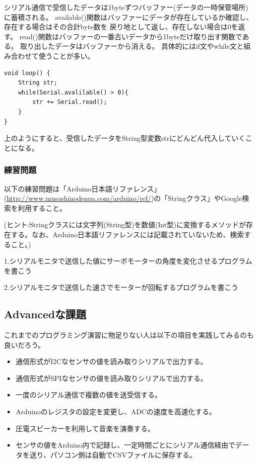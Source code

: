 \documentclass[uplatex]{jsarticle}
\begin{document}
シリアル通信で受信したデータは1byteずつバッファー(データの一時保管場所)に蓄積される。
available()関数はバッファーにデータが存在しているか確認し、存在する場合はその合計byte数を
戻り地として返し、存在しない場合は0を返す。
read()関数はバッファーの一番古いデータから1byteだけ取り出す関数である。
取り出したデータはバッファーから消える。
具体的にはif文やwhile文と組み合わせて使うことが多い。
\begin{lstlisting}[basicstyle=\ttfamily\footnotesize, frame=single]
void loop() {
    String str;
    while(Serial.avalilable() > 0){
        str += Serial.read();
    }
}
\end{lstlisting}
上のようにすると、受信したデータをString型変数strにどんどん代入していくことになる。
\subsubsection{練習問題}
以下の練習問題は「Arduino日本語リファレンス」(\url{http://www.musashinodenpa.com/arduino/ref/})の「Stringクラス」やGoogle検索を利用すること。

(ヒント:Stringクラスには文字列(String型)を数値(Int型)に変換するメソッドが存在する。なお、Arduino日本語リファレンスには記載されていないため、検索すること。)

1.シリアルモニタで送信した値にサーボモーターの角度を変化させるプログラムを書こう

2.シリアルモニタで送信した速さでモーターが回転するプログラムを書こう

\clearpage
\subsection{Advancedな課題}
これまでのプログラミング演習に物足りない人は以下の項目を実践してみるのも良いだろう。
\begin{itemize}
    \item 通信形式がI2Cなセンサの値を読み取りシリアルで出力する。
    \item 通信形式がSPIなセンサの値を読み取りシリアルで出力する。
    \item 一度のシリアル通信で複数の値を送受信する。
    \item Arduinoのレジスタの設定を変更し、ADCの速度を高速化する。
    \item 圧電スピーカーを利用して音楽を演奏する。
    \item センサの値をArduino内で記録し、一定時間ごとにシリアル通信経由でデータを送り、パソコン側は自動でCSVファイルに保存する。
\end{itemize}
\end{document}
